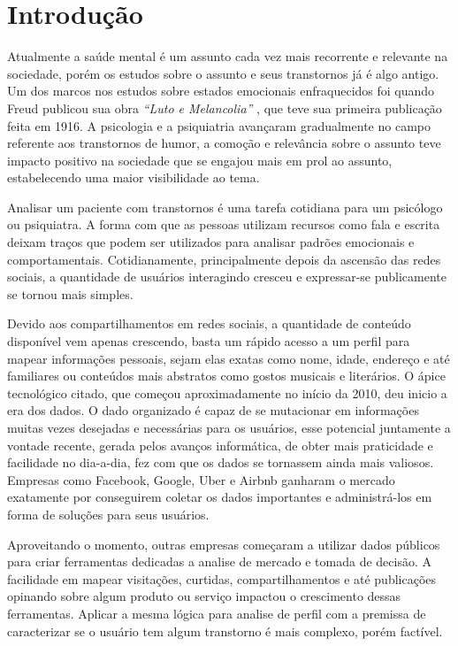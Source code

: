 \chapter*[Introdução]{Introdução}

Atualmente a saúde mental é um assunto cada vez mais recorrente e relevante na sociedade, porém os estudos sobre o assunto e seus transtornos já é algo antigo. Um dos marcos nos estudos sobre estados emocionais enfraquecidos foi quando Freud publicou sua obra \textit{“Luto e Melancolia”} \cite{freud2014livro}, que teve sua primeira publicação feita em 1916. A psicologia e a psiquiatria avançaram gradualmente no campo referente aos transtornos de humor, a comoção e relevância sobre o assunto teve impacto positivo na sociedade que se engajou mais em prol ao assunto, estabelecendo uma maior visibilidade ao tema.

Analisar um paciente com transtornos é uma tarefa cotidiana para um psicólogo ou psiquiatra. A forma com que as pessoas utilizam recursos como fala e escrita deixam traços que podem ser utilizados para analisar padrões emocionais e comportamentais. Cotidianamente, principalmente depois da ascensão das redes sociais, a quantidade de usuários interagindo cresceu e expressar-se publicamente se tornou mais simples.

Devido aos compartilhamentos em redes sociais, a quantidade de conteúdo disponível vem apenas crescendo, basta um rápido acesso a um perfil para mapear informações pessoais, sejam elas exatas como nome, idade, endereço e até familiares ou conteúdos mais abstratos como gostos musicais e literários. O ápice tecnológico citado, que começou aproximadamente no início da 2010, deu inicio a era dos dados. O dado organizado é capaz de se mutacionar em informações muitas vezes desejadas e necessárias para os usuários, esse potencial juntamente a vontade recente, gerada pelos avanços informática, de obter mais praticidade e facilidade no dia-a-dia, fez com que os dados se tornassem ainda mais valiosos. Empresas como Facebook, Google, Uber e Airbnb ganharam o mercado exatamente por conseguirem coletar os dados importantes e administrá-los em forma de soluções para seus usuários.

Aproveitando o momento, outras empresas começaram a utilizar dados públicos para criar ferramentas dedicadas a analise de mercado e tomada de decisão. A facilidade em mapear visitações, curtidas, compartilhamentos e até publicações opinando sobre algum produto ou serviço impactou o crescimento dessas ferramentas. Aplicar a mesma lógica para analise de perfil com a premissa de caracterizar se o usuário tem algum transtorno é mais complexo, porém factível.

